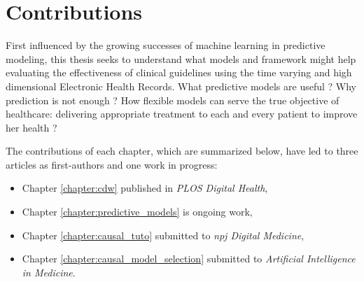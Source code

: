 \documentclass[french,12pt,twoside,a4paper]{book}
\begin{document}
\section{Contributions}\label{sec:intro:contributions}


First influenced by the growing successes of machine learning in predictive
modeling, this thesis seeks to understand what models and framework might help
evaluating the effectiveness of clinical guidelines using the time varying and
high dimensional Electronic Health Records. What predictive models are useful ?
Why prediction is not enough ? How flexible models can serve the true
objective of healthcare: delivering appropriate treatment to each and every
patient to improve her health \citep{cma_policy_appropriateness_2015}?

The contributions of each chapter, which are summarized below, have led to three
articles as first-authors and one work in progress:

\begin{itemize}
  \item Chapter \ref{chapter:cdw} published in \emph{PLOS Digital Health},
  \item Chapter \ref{chapter:predictive_models} is ongoing work,
  \item Chapter \ref{chapter:causal_tuto} submitted to \emph{npj Digital Medicine},
  \item Chapter \ref{chapter:causal_model_selection} submitted to \emph{Artificial Intelligence in Medicine}.
\end{itemize}
\end{document}

